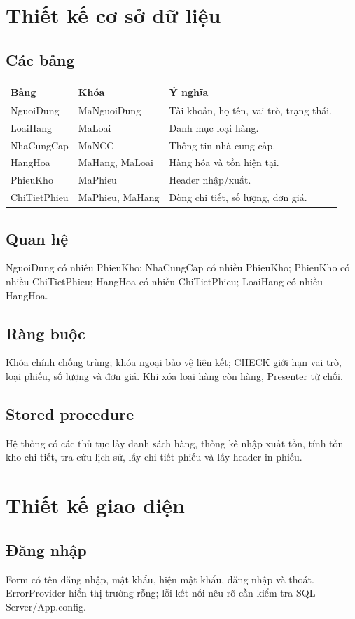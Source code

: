 \documentclass[12pt,a4paper]{report}
\begin{document}
\chapter{Thiết kế cơ sở dữ liệu}
\section{Các bảng}
\begin{longtable}{p{}p{}p{}}
\toprule Bảng & Khóa & Ý nghĩa\\\midrule
NguoiDung & MaNguoiDung & Tài khoản, họ tên, vai trò, trạng thái.\\
LoaiHang & MaLoai & Danh mục loại hàng.\\
NhaCungCap & MaNCC & Thông tin nhà cung cấp.\\
HangHoa & MaHang, MaLoai & Hàng hóa và tồn hiện tại.\\
PhieuKho & MaPhieu & Header nhập/xuất.\\
ChiTietPhieu & MaPhieu, MaHang & Dòng chi tiết, số lượng, đơn giá.\\
\bottomrule
\end{longtable}
\section{Quan hệ}
NguoiDung có nhiều PhieuKho; NhaCungCap có nhiều PhieuKho; PhieuKho có nhiều
ChiTietPhieu; HangHoa có nhiều ChiTietPhieu; LoaiHang có nhiều HangHoa.
\section{Ràng buộc}
Khóa chính chống trùng; khóa ngoại bảo vệ liên kết; CHECK giới hạn vai trò,
loại phiếu, số lượng và đơn giá. Khi xóa loại hàng còn hàng, Presenter từ chối.
\section{Stored procedure}
Hệ thống có các thủ tục lấy danh sách hàng, thống kê nhập xuất tồn, tính tồn kho
chi tiết, tra cứu lịch sử, lấy chi tiết phiếu và lấy header in phiếu.

\chapter{Thiết kế giao diện}
\section{Đăng nhập}
Form có tên đăng nhập, mật khẩu, hiện mật khẩu, đăng nhập và thoát. ErrorProvider
hiển thị trường rỗng; lỗi kết nối nêu rõ cần kiểm tra SQL Server/App.config.
\end{document}
